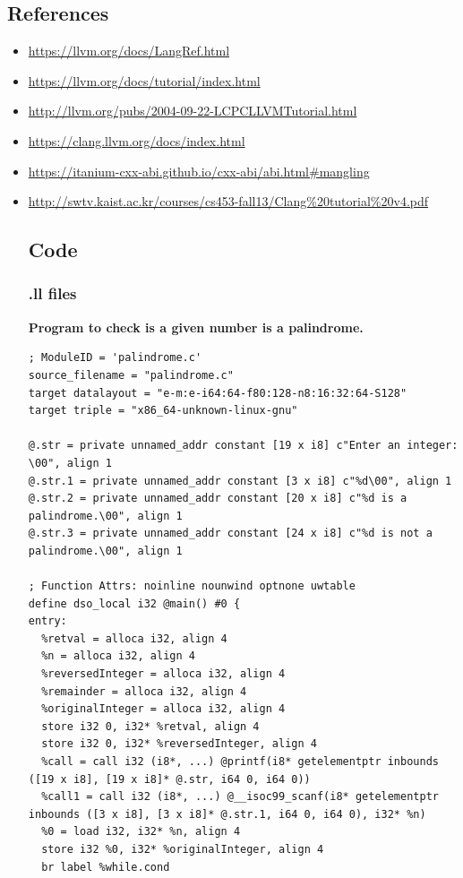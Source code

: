 \documentclass[12pt]{article}
\begin{document}
\subsection{References}
\begin{itemize}
\item \href{https://llvm.org/docs/LangRef.html}{https://llvm.org/docs/LangRef.html}
\item \href{https://llvm.org/docs/tutorial/index.html}{https://llvm.org/docs/tutorial/index.html}
\item \href{http://llvm.org/pubs/2004-09-22-LCPCLLVMTutorial.html}{http://llvm.org/pubs/2004-09-22-LCPCLLVMTutorial.html}
\item \href{https://clang.llvm.org/docs/index.html}{https://clang.llvm.org/docs/index.html}
\item \href{https://itanium-cxx-abi.github.io/cxx-abi/abi.html\#mangling}{https://itanium-cxx-abi.github.io/cxx-abi/abi.html\#mangling}
\item \href{http://swtv.kaist.ac.kr/courses/cs453-fall13/Clang\%20tutorial\%20v4.pdf}{http://swtv.kaist.ac.kr/courses/cs453-fall13/Clang\%20tutorial\%20v4.pdf}
\subsection{Code}
\subsubsection{.ll files}
\textbf{Program to check is a given number is a palindrome.}
\begin{lstlisting}[style=CStyle]
; ModuleID = 'palindrome.c'
source_filename = "palindrome.c"
target datalayout = "e-m:e-i64:64-f80:128-n8:16:32:64-S128"
target triple = "x86_64-unknown-linux-gnu"

@.str = private unnamed_addr constant [19 x i8] c"Enter an integer: \00", align 1
@.str.1 = private unnamed_addr constant [3 x i8] c"%d\00", align 1
@.str.2 = private unnamed_addr constant [20 x i8] c"%d is a palindrome.\00", align 1
@.str.3 = private unnamed_addr constant [24 x i8] c"%d is not a palindrome.\00", align 1

; Function Attrs: noinline nounwind optnone uwtable
define dso_local i32 @main() #0 {
entry:
  %retval = alloca i32, align 4
  %n = alloca i32, align 4
  %reversedInteger = alloca i32, align 4
  %remainder = alloca i32, align 4
  %originalInteger = alloca i32, align 4
  store i32 0, i32* %retval, align 4
  store i32 0, i32* %reversedInteger, align 4
  %call = call i32 (i8*, ...) @printf(i8* getelementptr inbounds ([19 x i8], [19 x i8]* @.str, i64 0, i64 0))
  %call1 = call i32 (i8*, ...) @__isoc99_scanf(i8* getelementptr inbounds ([3 x i8], [3 x i8]* @.str.1, i64 0, i64 0), i32* %n)
  %0 = load i32, i32* %n, align 4
  store i32 %0, i32* %originalInteger, align 4
  br label %while.cond


\end{lstlisting}
\end{itemize}
\end{document}
